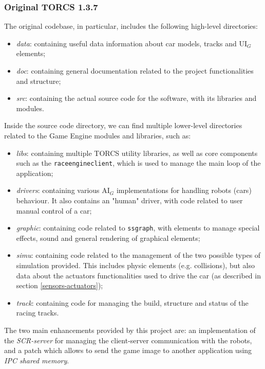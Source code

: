 \subsubsection{Original TORCS 1.3.7}
The original codebase, in particular, includes the following high-level directories:
\begin{itemize}
	\item \textit{data}: containing useful data information about car models, tracks and UI$_G$ elements;
	\item \textit{doc}: containing general documentation related to the project functionalities and structure;
	\item \textit{src}: containing the actual source code for the software, with its libraries and modules.
\end{itemize}
Inside the source code directory, we can find multiple lower-level directories related to the Game Engine modules and libraries, such as:
\begin{itemize}
	\item \textit{libs}: containing multiple TORCS utility libraries, as well as core components such as the \texttt{raceengineclient}, which is used to manage the main loop of the application;
	\item \textit{drivers}: containing various AI$_G$ implementations for handling robots (cars) behaviour. It also contains an "human" driver, with code related to user manual control of a car;
	\item \textit{graphic}: containing code related to \texttt{ssgraph}, with elements to manage special effects, sound and general rendering of graphical elements;
	\item \textit{simu}: containing code related to the management of the two possible types of simulation provided. This includes physic elements (e.g. collisions), but also data about the actuators functionalities used to drive the car (as described in section \ref{sensors-actuators});
	\item \textit{track}: containing code for managing the build, structure and status of the racing tracks. 
\end{itemize}
The two main enhancements provided by this project are: an implementation of the \textit{SCR-server} for managing the client-server communication with the robots, and a patch which allows to send the game image to another application using \textit{IPC shared memory}.

